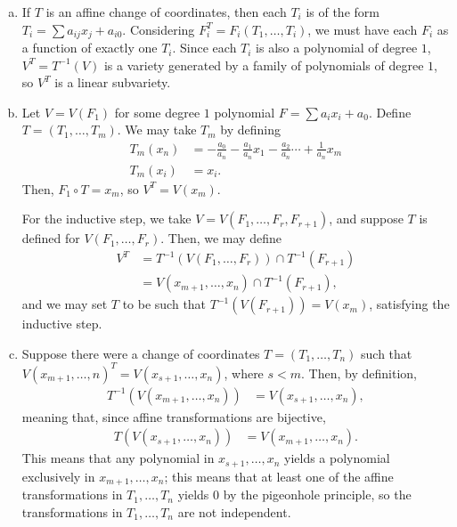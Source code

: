 \documentclass[10pt]{mypackage}
\begin{document}
\begin{solution}\hfill
  \begin{enumerate}[(a)]
    \item If $T$ is an affine change of coordinates, then each $T_i$ is of the form $T_i = \sum a_{ij}x_j + a_{i0}$. Considering $F_i^T = F_i\left( T_1,\dots,T_i \right)$, we must have each $F_i$ as a function of exactly one $T_i$. Since each $T_i$ is also a polynomial of degree $1$, $V^T = T^{-1}\left( V \right)$ is a variety generated by a family of polynomials of degree $1$, so $V^T$ is a linear subvariety.
    \item Let $V = V\left(F_1\right)$ for some degree $1$ polynomial $F = \sum a_i x_i + a_0$. Define $T = \left( T_1,\dots,T_m \right)$. We may take $T_m$ by defining
      \begin{align*}
        T_m\left( x_n \right) &= - \frac{a_0}{a_n} -\frac{a_1}{a_n}x_1 - \frac{a_2}{a_n} \cdots + \frac{1}{a_n}x_m\\
        T_m\left( x_i \right) &= x_i.\tag*{$i\leq n-1$}
      \end{align*}
      Then, $F_1\circ T = x_m$, so $V^T = V\left( x_m \right)$.\newline

      For the inductive step, we take $V = V\left( F_1,\dots,F_r,F_{r+1} \right)$, and suppose $T$ is defined for $V\left( F_1,\dots, F_r \right)$. Then, we may define
      \begin{align*}
        V^T &= T^{-1}\left( V\left( F_1,\dots,F_r \right) \right)\cap T^{-1}\left( F_{r+1} \right)\\
            &= V\left( x_{m+1},\dots,x_n \right)\cap T^{-1}\left( F_{r+1} \right),
      \end{align*}
      and we may set $T$ to be such that $T^{-1}\left( V\left( F_{r+1} \right) \right) = V\left( x_m \right)$, satisfying the inductive step.
    \item Suppose there were a change of coordinates $T = \left( T_1,\dots,T_n \right)$ such that $V\left( x_{m+1},\dots,n \right)^{T} = V\left( x_{s+1},\dots,x_n \right)$, where $s < m$. Then, by definition,
      \begin{align*}
        T^{-1}\left( V\left( x_{m+1},\dots,x_{n} \right) \right)  &= V\left( x_{s+1},\dots,x_n \right),
      \end{align*}
      meaning that, since affine transformations are bijective,
      \begin{align*}
        T\left( V\left( x_{s+1},\dots,x_n \right) \right) &= V\left( x_{m+1},\dots,x_n \right).
      \end{align*}
      This means that any polynomial in $x_{s+1},\dots,x_n$ yields a polynomial exclusively in $x_{m+1},\dots,x_n$; this means that at least one of the affine transformations in $T_1,\dots,T_n$ yields $0$ by the pigeonhole principle, so the transformations in $T_1,\dots,T_n$ are not independent.
  \end{enumerate}
\end{solution}
\end{document}
